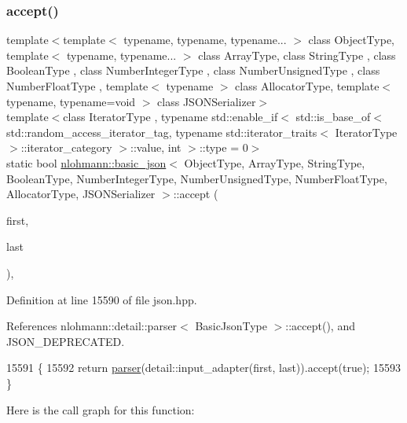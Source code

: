\subsubsection{\texorpdfstring{accept()}{accept()}\hspace{0.1cm}{\footnotesize\ttfamily [3/3]}}
{\footnotesize\ttfamily template$<$template$<$ typename, typename, typename... $>$ class Object\+Type, template$<$ typename, typename... $>$ class Array\+Type, class String\+Type , class Boolean\+Type , class Number\+Integer\+Type , class Number\+Unsigned\+Type , class Number\+Float\+Type , template$<$ typename $>$ class Allocator\+Type, template$<$ typename, typename=void $>$ class J\+S\+O\+N\+Serializer$>$ \\
template$<$class Iterator\+Type , typename std\+::enable\+\_\+if$<$ std\+::is\+\_\+base\+\_\+of$<$ std\+::random\+\_\+access\+\_\+iterator\+\_\+tag, typename std\+::iterator\+\_\+traits$<$ Iterator\+Type $>$\+::iterator\+\_\+category $>$\+::value, int $>$\+::type  = 0$>$ \\
static bool \hyperlink{classnlohmann_1_1basic__json}{nlohmann\+::basic\+\_\+json}$<$ Object\+Type, Array\+Type, String\+Type, Boolean\+Type, Number\+Integer\+Type, Number\+Unsigned\+Type, Number\+Float\+Type, Allocator\+Type, J\+S\+O\+N\+Serializer $>$\+::accept (\begin{DoxyParamCaption}\item[{Iterator\+Type}]{first,  }\item[{Iterator\+Type}]{last }\end{DoxyParamCaption})\hspace{0.3cm}{\ttfamily [inline]}, {\ttfamily [static]}}



Definition at line 15590 of file json.\+hpp.



References nlohmann\+::detail\+::parser$<$ Basic\+Json\+Type $>$\+::accept(), and J\+S\+O\+N\+\_\+\+D\+E\+P\+R\+E\+C\+A\+T\+ED.


\begin{DoxyCode}
15591     \{
15592         \textcolor{keywordflow}{return} \hyperlink{classnlohmann_1_1basic__json_aba9704e82d18f8954f9925e26cec7a51}{parser}(detail::input\_adapter(first, last)).accept(\textcolor{keyword}{true});
15593     \}
\end{DoxyCode}
Here is the call graph for this function\+:
\mbox{\label{classnlohmann_1_1basic__json_aa80485befaffcadaa39965494e0b4d2e}} 
